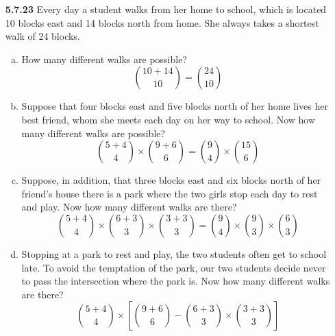 \documentclass[12pt]{article}
\begin{document}
\begin{enumerate}
    \newpage
    \item[\bf 5.7.23] Every day a student walks from her home to school, which is located 10 blocks east and 14 blocks north from home. She always takes a shortest walk of 24 blocks.
    \begin{enumerate}[(a)]
        \item How many different walks are possible?\\
        $$\binom{10+14}{10} = \binom{24}{10}$$
        
        \item Suppose that four blocks east and five blocks north of her home lives her best friend, whom she meets each day on her way to school. Now how many different walks are possible?\\
        $$\binom{5+4}{4}\times\binom{9+6}{6} = \binom{9}{4}\times\binom{15}{6} $$
        \item Suppose, in addition, that three blocks east and six blocks north of her friend's house there is a park where the two girls stop each day to rest and play. Now how many different walks are there?\\
        $$\binom{5+4}{4}\times\binom{6+3}{3}\times\binom{3+3}{3} = \binom{9}{4}\times\binom{9}{3}\times\binom{6}{3}$$
        
        \item Stopping at a park to rest and play, the two students often get to school late. To avoid the temptation of the park, our two students decide never to pass the intersection where the park is. Now how many different walks are there?\\
        $$\binom{5+4}{4}\times\left[\binom{9+6}{6}-\binom{6+3}{3}\times\binom{3+3}{3}\right]$$
    \end{enumerate}
\end{enumerate}
\end{document}
